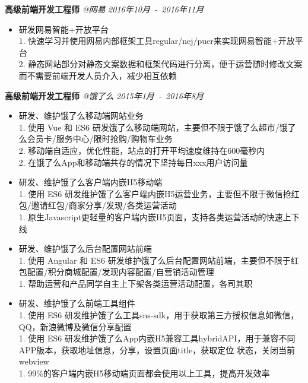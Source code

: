 ﻿\documentclass[9pt]{article}
\newenvironment{changemargin}[2]{%
  \begin{list}{}{%
    \setlength{\topsep}{0pt}%
    \setlength{\leftmargin}{#1}%
    \setlength{\rightmargin}{#2}%
    \setlength{\listparindent}{\parindent}%
    \setlength{\itemindent}{\parindent}%
    \setlength{\parsep}{\parskip}%
  }%
  \item[]}{\end{list}
}
\newenvironment{body} {
	\vspace*{-16pt}
	\begin{changemargin}{-0.25in}{-0.5in}
  }	
	{\end{changemargin}
}
\begin{document}
\begin{body}
    \textbf{高级前端开发工程师} \emph{@网易} \hfill \emph{2016年10月~-~2016年11月}\\
    \vspace*{-4pt}
    \begin{itemize} \itemsep -0pt  %
        \item 研发网易智能+开放平台 \\
        1. 快速学习并使用网易内部框架工具regular/nej/puer来实现网易智能+开放平台\\
        2. 静态网站部分对静态文案数据和框架代码进行分离，便于运营随时修改文案而不需要前端开发人员介入，减少相互依赖\\
    \end{itemize}

    \textbf{高级前端开发工程师} \emph{@饿了么} \hfill \emph{2015年1月~-~2016年8月}\\
    \vspace*{-4pt}
    \begin{itemize} \itemsep -0pt  %
        \item 研发、维护饿了么移动端网站业务\\
        1. 使用 Vue 和 ES6 研发饿了么移动端网站，主要但不限于饿了么超市/饿了么会员卡/服务中心/限时抢购/购物车业务\\
        2. 移动端自适应，优化性能，站点的打开平均速度维持在600毫秒内\\
        2. 在饿了么App和移动端共存的情况下坚持每日xxx用户访问量\\
        \item 研发、维护饿了么客户端内嵌H5移动端\\
        1. 使用 ES6 研发维护饿了么客户端内嵌H5运营业务，主要但不限于微信抢红包/邀请红包/商家分享/发现/各类运营活动\\
        1. 原生Javascript更轻量的客户端内嵌H5页面，支持各类运营活动的快速上下线 \\
        \item 研发、维护饿了么后台配置网站前端\\
        1. 使用 Angular 和 ES6 研发维护饿了么后台配置网站前端，主要但不限于红包配置/积分商城配置/发现内容配置/自营销活动管理\\
        1. 帮助运营和产品同学自主上下架各类运营活动配置，各司其职 \\
        \item 研发、维护饿了么前端工具组件\\
        1. 使用 ES6 研发维护饿了么工具sns-sdk，用于获取第三方授权信息如微信，QQ，新浪微博及微信分享配置\\
        1. 使用 ES6 研发维护饿了么App内嵌H5兼容工具hybridAPI，用于兼容不同APP版本，获取地址信息，分享，设置页面title，获取定位 状态，关闭当前webview \\
        1. 99\%的客户端内嵌H5移动端页面都会使用以上工具，提高开发效率\\
    \end{itemize}


\end{body}
\end{document}
